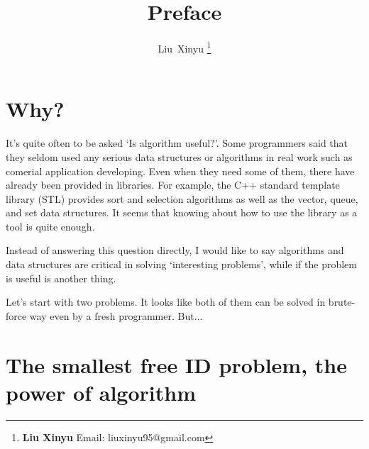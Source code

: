 \documentclass{article}
\begin{document}
\fi


\title{Preface}

\author{Liu~Xinyu
\thanks{{\bfseries Liu Xinyu } \newline
  Email: liuxinyu95@gmail.com \newline}
  }


\maketitle

\section{Why?}
\label{why}

It's quite often to be asked `Is algorithm useful?'. Some programmers
said that they seldom used any serious data structures or algorithms
in real work such as comerial application developing. Even when they need
some of them, there have already been provided in libraries. For example,
the C++ standard template library (STL) provides sort and selection
algorithms as well as the vector, queue, and set data structures.
It seems that knowing about how to use the library as a tool is quite 
enough.

Instead of answering this question directly, I would like to
say algorithms and data structures are critical in solving `interesting
problems', while if the problem is useful is another thing.

Let's start with two problems. It looks like both of them can be 
solved in brute-force way even by a fresh programmer. But...

\section{The smallest free ID problem, the power of algorithm}
\label{min-free}
\end{document}
